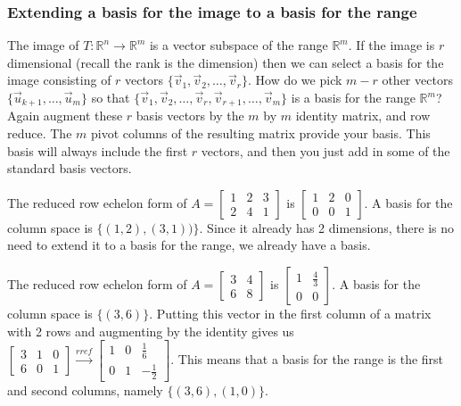 \subsubsection{Extending a basis for the image to a basis for the range}
The image of $T\colon{\mathbb{R}}^n\to{\mathbb{R}}^m$ is a vector subspace of the range ${\mathbb{R}}^m$. If the image is $r$ dimensional (recall the rank is the dimension) then we can select a basis for the image consisting of $r$ vectors $\{\vec v_1, \vec v_2,\ldots, \vec v_r\}$. How do we pick $m-r$ other vectors $\{\vec u_{k+1},\ldots, \vec u_m\}$ so that $\{\vec v_1, \vec v_2,\ldots, \vec v_r,\vec v_{r+1},\ldots, \vec v_m\}$ is a basis for the range ${\mathbb{R}}^m$? Again augment these $r$ basis vectors by the $m$ by $m$ identity matrix, and row reduce.  The $m$ pivot columns of the resulting matrix provide your basis.  This basis will always include the first $r$ vectors, and then you just add in some of the standard basis vectors.

\begin{example}
The reduced row echelon form of 
$A=
\begin{bmatrix}
 1 & 2 & 3 \\
 2 & 4 & 1
\end{bmatrix}
$
is
$
\begin{bmatrix}
 1 & 2 & 0 \\
 0 & 0 & 1
\end{bmatrix}
$.  A basis for the column space is $\{(1,2),(3,1))\}$. Since it already has 2 dimensions, there is no need to extend it to a basis for the range, we already have a basis.
\end{example}

\begin{example}
The reduced row echelon form of 
$A=
\begin{bmatrix}
 3 & 4 \\
 6 & 8
\end{bmatrix}
$
is
$
\begin{bmatrix}
 1 & \frac{4}{3} \\
 0 & 0
\end{bmatrix}
$.  A basis for the column space is $\{(3,6)\}$. Putting this vector in the first column of a matrix with 2 rows and augmenting by the identity gives us 
$
\begin{bmatrix}
 3 & 1 & 0 \\
 6 & 0 & 1
\end{bmatrix}
\xrightarrow{rref}
\begin{bmatrix}
 1 & 0 & \frac{1}{6} \\
 0 & 1 & -\frac{1}{2}
\end{bmatrix}
$.
This means that a basis for the range is the first and second columns, namely $\{(3,6),(1,0)\}$.
\end{example}


